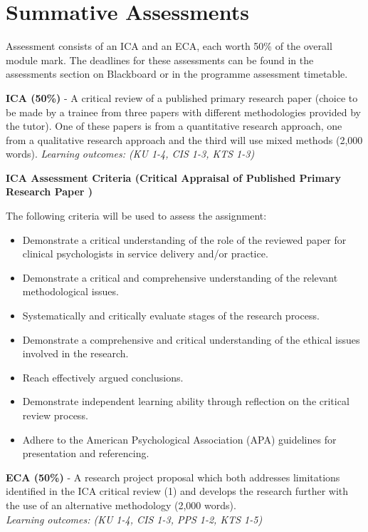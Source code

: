 \documentclass[
]{book}
\providecommand{\tightlist}{%
  \setlength{\itemsep}{0pt}\setlength{\parskip}{0pt}}
\begin{document}
\hypertarget{summative-assessments}{%
\section{Summative Assessments}\label{summative-assessments}}

Assessment consists of an ICA and an ECA, each worth 50\% of the overall module mark. The deadlines for these assessments can be found in the assessments section on Blackboard or in the programme assessment timetable.

\textbf{ICA (50\%)} - A critical review of a published primary research paper (choice to be made by a trainee from three papers with different methodologies provided by the tutor). One of these papers is from a quantitative research approach, one from a qualitative research approach and the third will use mixed methods (2,000 words).
\emph{Learning outcomes: (KU 1-4, CIS 1-3, KTS 1-3)}

\textbf{ICA Assessment Criteria (Critical Appraisal of Published Primary Research Paper )}

The following criteria will be used to assess the assignment:

\begin{itemize}
\tightlist
\item
  Demonstrate a critical understanding of the role of the reviewed paper for clinical psychologists in service delivery and/or practice.
\item
  Demonstrate a critical and comprehensive understanding of the relevant methodological issues.
\item
  Systematically and critically evaluate stages of the research process.
\item
  Demonstrate a comprehensive and critical understanding of the ethical issues involved in the research.
\item
  Reach effectively argued conclusions.
\item
  Demonstrate independent learning ability through reflection on the critical review process.
\item
  Adhere to the American Psychological Association (APA) guidelines for presentation and referencing.
\end{itemize}

\textbf{ECA (50\%)} - A research project proposal which both addresses limitations identified in the ICA critical review (1) and develops the research further with the use of an alternative methodology (2,000 words).\\
\emph{Learning outcomes: (KU 1-4, CIS 1-3, PPS 1-2, KTS 1-5)}
\end{document}

